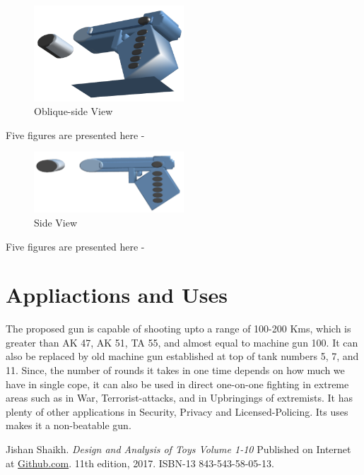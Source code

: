 \documentclass[]{article}
\begin{document}
\begin{figure}[h]
	\centering
	\includegraphics[width=0.5\textwidth]{4.png}
	\caption{Oblique-side View}
	\label{image-4}
\end{figure}Five figures are presented here -
\begin{figure}[h]
	\centering
	\includegraphics[width=0.5\textwidth]{5.png}
	\caption{Side View}
	\label{image-5}
\end{figure}Five figures are presented here -
\section{Appliactions and Uses}
The proposed gun is capable of shooting upto a range of 100-200 Kms, which is greater than AK 47, AK 51, TA 55, and almost equal to machine gun 100. It can also be replaced by old machine gun established at top of tank numbers 5, 7, and 11. Since, the number of rounds it takes in one time depends on how much we have in single cope, it can also be used in direct one-on-one fighting in extreme areas such as in War, Terrorist-attacks, and in Upbringings of extremists. It has plenty of other applications in Security, Privacy and Licensed-Policing. Its uses makes it a non-beatable gun.
\begin{thebibliography}{10}
	 Jishan Shaikh. \textit{Design and Analysis of Toys Volume 1-10} Published on Internet at \href{https://www.github.com/JShaikh/}{Github.com}. 11th edition, 2017. ISBN-13 843-543-58-05-13.
\end{thebibliography}
\end{document}
